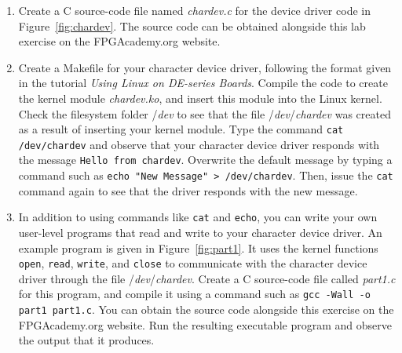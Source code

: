 \documentclass[epsfig,10pt,fullpage]{article}
\begin{document}
\begin{enumerate}
\item Create a C source-code file named {\it chardev.c} for the device driver code in 
Figure~\ref{fig:chardev}. The source code can be obtained alongside this lab exercise on 
the FPGAcademy.org website. 
\item Create a Makefile for your character device driver, following the format given in
the tutorial {\it Using Linux on DE-series Boards}. Compile the code to create the kernel module 
{\it chardev.ko}, and insert this module into the Linux kernel. 
Check the filesystem folder /{\it dev} to see that the file /{\it dev}/{\it chardev} was
created as a result of inserting your kernel module. Type the command \texttt{cat
/dev/chardev} and observe that your character device driver responds with the message
\texttt{Hello from chardev}. Overwrite the default message by typing a command such as
\texttt{echo "New Message" > /dev/chardev}. Then, issue the \texttt{cat} command again to
see that the driver responds with the new message.
\item
In addition to using commands like \texttt{cat} and \texttt{echo}, you can write your own
user-level programs that read and write to your character device driver. An example program 
is given in Figure~\ref{fig:part1}. It uses the kernel functions \texttt{open}, \texttt{read},
\texttt{write}, and \texttt{close} to communicate with the character device driver through
the file /{\it dev}/{\it chardev}. Create a C source-code file called {\it part1.c} for
this program, and compile it using a command such as \texttt{gcc -Wall -o part1 part1.c}.
You can obtain the source code alongside this exercise on the FPGAcademy.org 
website. Run the resulting executable program and observe the output that it produces.
\end{enumerate}
\end{document}
